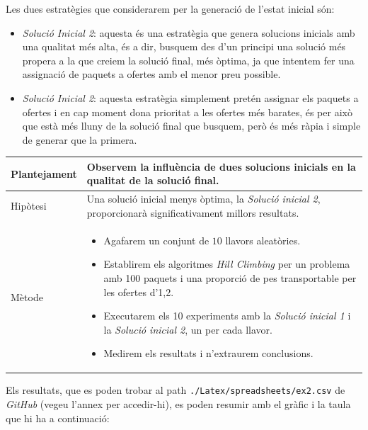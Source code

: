 \documentclass[a4paper]{article}
\begin{document}
	Les dues estratègies que considerarem per la generació de l'estat inicial són:
	
	\begin{itemize}
		\item \emph{Solució Inicial 2}: aquesta és una estratègia que genera solucions inicials amb una qualitat més alta, és a dir, busquem des d'un principi una solució més propera a la que creiem la solució final, més òptima, ja que intentem fer una assignació de paquets a ofertes amb el menor preu possible.
		
		\item \emph{Solució Inicial 2}: aquesta estratègia simplement pretén assignar els paquets a ofertes i en cap moment dona prioritat a les ofertes més barates, és per això que està més lluny de la solució final que busquem, però és més ràpia i simple de generar que la primera.
	\end{itemize}
	
	
	\begin{table}[ht]
		\centering
		\begin{tabular}{|l|p{10cm}|}
			\hline
			Plantejament & Observem la influència de dues solucions inicials en la qualitat de la solució final. \\
			\hline
			Hipòtesi & Una solució inicial menys òptima, la \textit{Solució inicial 2}, proporcionarà significativament millors resultats.\\
			\hline
			Mètode & 
			\begin{itemize}
				\item Agafarem un conjunt de $10$ llavors aleatòries.
				\item Establirem els algoritmes \textit{Hill Climbing} per un problema amb 100 paquets i una proporció de pes transportable per les ofertes d'1,2.
				\item Executarem els 10 experiments amb la \textit{Solució inicial 1} i la \textit{Solució inicial 2}, un per cada llavor.
				\item Medirem els resultats i n'extraurem conclusions.
			\end{itemize} \\
			\hline
		\end{tabular}
		\label{tab:exp2_apartats}
	\end{table}
	
	Els resultats, que es poden trobar al path \texttt{./Latex/spreadsheets/ex2.csv} de \textit{GitHub} (vegeu l'annex per accedir-hi), es poden resumir amb el gràfic i la taula que hi ha a continuació:
	
\end{document}
